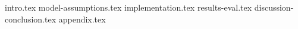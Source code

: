 \documentclass[11pt]{article}
\begin{document}
\begin{center}
\end{center}
\vspace*{-5mm}
{intro.tex}
{model-assumptions.tex}
{implementation.tex}
{results-eval.tex}
{discussion-conclusion.tex}
{appendix.tex}
\end{document}
